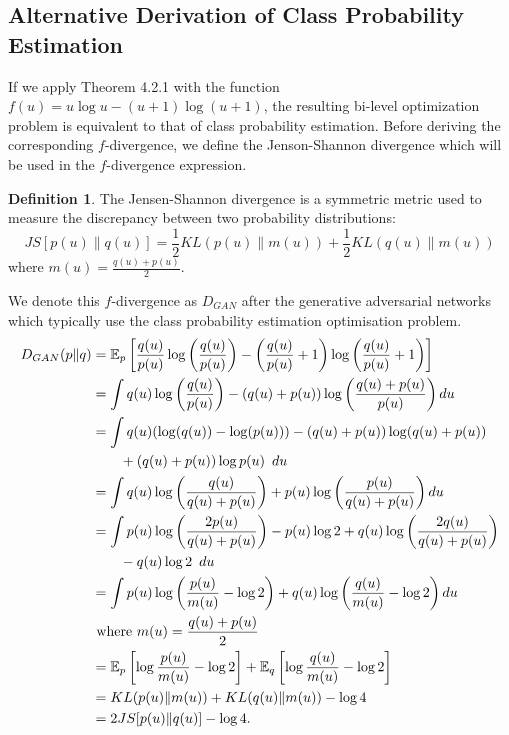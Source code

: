 \documentclass[honours,12pt]{unswthesis}
\newcommand{\E}{\mathbb{E}}
\numberwithin{equation}{section}
\theoremstyle{definition}
\newtheorem{definition}[theorem]{Definition}
\begin{document}
\subsection{Alternative Derivation of Class Probability Estimation}
If we apply Theorem 4.2.1 with the function $f(u)=u\log u-(u+1)\log (u+1)$, the resulting bi-level optimization problem is equivalent to that of class probability estimation\citep{tiao}. Before deriving the corresponding $f$-divergence, we define the Jenson-Shannon divergence which will be used in the $f$-divergence expression.
\begin{definition}
The Jensen-Shannon divergence is a symmetric metric used to measure the discrepancy between two probability distributions\citep{JS}:
\[JS[p(u)\|q(u)]=\frac12 KL(p(u)\|m(u))+\frac12 KL(q(u)\|m(u))\]
where $m(u)=\frac{q(u)+p(u)}{2}$.
\end{definition}
We denote this $f$-divergence as $D_{GAN}$ after the generative adversarial networks which typically use the class probability estimation optimisation problem\citep{gan}.
\begin{align*}
D_{GAN}(p\|q)&= \E_p\left[\frac{q(u)}{p(u)}\log \left(\frac{q(u)}{p(u)}\right)-\left(\frac{q(u)}{p(u)}+1 \right)\log\left(\frac{q(u)}{p(u)}+1\right)\right]\\
&= \int q(u)\log\left(\frac{q(u)}{p(u)}\right)-(q(u)+p(u))\log\left(\frac{q(u)+p(u)}{p(u)}\right)du\\
&= \int q(u)(\log(q(u))-\log(p(u)))-(q(u)+p(u))\log(q(u)+p(u))\\
&\qquad +(q(u)+p(u))\log p(u)\enskip du\\
&= \int q(u)\log\left(\frac{q(u)}{q(u)+p(u)}\right)+p(u)\log \left(\frac{p(u)}{q(u)+p(u)}\right) du\\
&= \int p(u)\log \left(\frac{2p(u)}{q(u)+p(u)}\right)-p(u)\log 2+q(u)\log \left(\frac{2q(u)}{q(u)+p(u)}\right)\\
&\qquad -q(u)\log 2\enskip du\\
&= \int p(u)\log \left(\frac{p(u)}{m(u)}-\log 2\right)+q(u)\log \left(\frac{q(u)}{m(u)}-\log 2\right)du\\
&\text{ where }m(u)=\frac{q(u)+p(u)}{2}\\
&= \E_p \left[\log \frac{p(u)}{m(u)}-\log 2\right]+\E_q\left[\log\frac{q(u)}{m(u)}-\log 2\right]\\
&= KL(p(u)\|m(u))+KL(q(u)\|m(u))-\log 4\\
&= 2JS[p(u)\|q(u)]-\log 4.
\end{align*}
\end{document}
